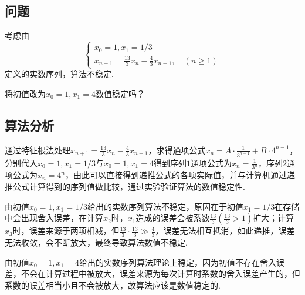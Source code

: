 \documentclass[UTF8,ctexart,a4paper,11pt,openany]{article}
\theoremstyle{definition}
\begin{document}
    \subsection{问题}
    考虑由$$\left\{\begin{array}{l}x_{0}=1, x_{1}=1 / 3 \\ x_{n+1}=\frac{13}{3} x_{n}-\frac{4}{3} x_{n-1}, \quad(n \geq 1)\end{array}\right.$$\indent 定义的实数序列，算法不稳定.\par 将初值改为$x_0=1,x_1=4$数值稳定吗？
    \subsection{算法分析}
    通过特征根法处理$x_{n+1}=\frac{13}{3} x_{n}-\frac{4}{3} x_{n-1}$，求得通项公式$x_n=A\cdot \frac{1}{3^{n-1}}+B\cdot 4^{n-1}$，分别代入$x_0=1,x_1=1/3$与$x_0=1,x_1=4$得到序列$1$通项公式为$x_n=\frac{1}{3^n}$，序列$2$通项公式为$x_n=4^n$，由此可以直接得到递推公式的各项实际值，并与计算机通过递推公式计算得到的序列值做比较，通过实验验证算法的数值稳定性.\par
    由初值$x_0=1,x_1=1/3$给出的实数序列算法不稳定，原因在于初值$x_1=1/3$在存储中会出现舍入误差，在计算$x_2$时，$x_1$造成的误差会被系数$\frac{13}{3}(\frac{13}{3}>1)$扩大；计算$x_3$时，误差来源于两项相减，但$\frac{13}{3}\cdot\frac{13}{3}\gg\frac{4}{3}$，误差无法相互抵消，如此递推，误差无法收敛，会不断放大，最终导致算法数值不稳定.\par
    由初值$x_0=1,x_1=4$给出的实数序列算法理论上稳定，因为初值不存在舍入误差，不会在计算过程中被放大，误差来源为每次计算时系数的舍入误差产生的，但系数的误差相当小且不会被放大，故算法应该是数值稳定的.\par
\end{document}
